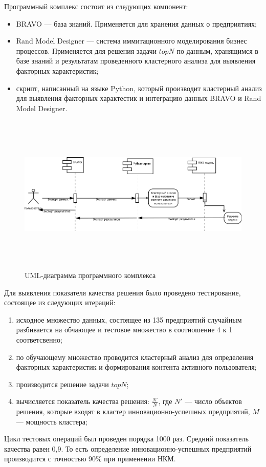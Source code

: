 Программный комплекс состоит из следующих компонент:
\begin{itemize}
	\item BRAVO --- база знаний. Применяется для хранения данных о предприятиях;
	\item Rand Model Designer --- система иммитационного моделирования бизнес процессов. Применяется для решения задачи $topN$
		по данным, хранящимся в базе знаний и результатам проведенного кластерного анализа для выявления факторных характеристик;
	\item скрипт, написанный на языке Python, который производит кластерный анализ для выявления факторных характестик и интеграцию
		данных BRAVO и Rand Model Designer.
\end{itemize}

\begin{figure}[H]
	\caption{UML-диаграмма программного комплекса}
	\begin{center}
		\includegraphics[width=6in,height=3in]{pics/integration.png}
	\end{center}
\end{figure}

Для выявления показателя качества решения было проведено тестирование, состоящее из следующих итераций:
\begin{enumerate}
	\item исходное множество данных, состоящее из 135 предприятий случайным разбивается на обчающее и тестовое множество в соотношение 4 к 1 соответсвенно;
	\item по обучающему множество проводится кластерный анализ для определения факторных характеристик и формирования контента активного пользователя;
	\item производится решение задачи $topN$;
	\item вычисляется показатель качества решения: $\frac{N'}{N}$, где $N'$ --- число объектов решения, которые входят в кластер инновационно-успешных предприятий,
		$M$ --- мощность кластера;
\end{enumerate}
Цикл тестовых операций был проведен порядка 1000 раз. Средний показатель качества равен 0,9. То есть определение инновационно-успешных предприятий производится с точностью
90\% при применении НКМ.


